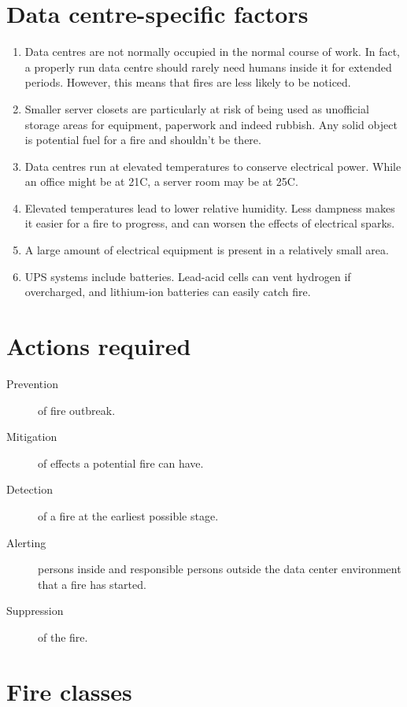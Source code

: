 \documentclass{pgnotes}
\begin{document}
\section{Data centre-specific factors}
\label{sec:data-centre-specific-factors}

\begin{enumerate}
\item
  Data centres are not normally occupied in the normal course of work.
  In fact, a properly run data centre should rarely need humans inside
  it for extended periods. However, this means that fires are less
  likely to be noticed.
\item
  Smaller server closets are particularly at risk of being used as
  unofficial storage areas for equipment, paperwork and indeed rubbish.
  Any solid object is potential fuel for a fire and shouldn't be there.
\item
  Data centres run at elevated temperatures to conserve electrical
  power. While an office might be at 21C, a server room may be at 25C.
\item
  Elevated temperatures lead to lower relative humidity. Less dampness
  makes it easier for a fire to progress, and can worsen the effects of
  electrical sparks.
\item
  A large amount of electrical equipment is present in a relatively
  small area.
\item
  UPS systems include batteries. Lead-acid cells can vent hydrogen if
  overcharged, and lithium-ion batteries can easily catch fire.
\end{enumerate}

\section{Actions required}
\label{sec:actions-required}

\begin{description}
\item[Prevention]
of fire outbreak.
\item[Mitigation]
of effects a potential fire can have.
\item[Detection]
of a fire at the earliest possible stage.
\item[Alerting]
persons inside and responsible persons outside the data center
environment that a fire has started.
\item[Suppression]
of the fire.
\end{description}

\section{Fire classes}
\label{sec:fire-classes}
\end{document}
